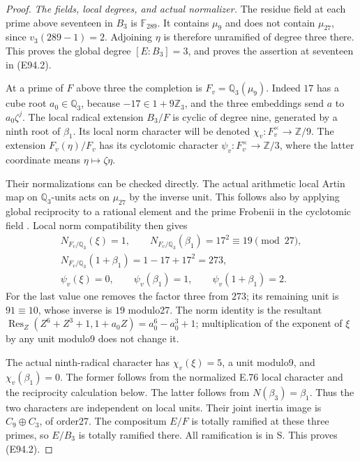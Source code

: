\begin{proof}
\emph{The fields, local degrees, and actual normalizer.}
The residue field at each prime above seventeen in
\(B_3\) is \(\mathbb F_{289}\). It contains \(\mu_9\)
and does not contain \(\mu_{27}\), since
\(v_3(289-1)=2\). Adjoining \(\eta\) is therefore
unramified of degree three there. This proves the
global degree \([E:B_3]=3\), and proves the assertion
at seventeen in (E94.2).

At a prime of \(F\) above three the completion is
\(F_v=\mathbb Q_3(\mu_9)\). Indeed \(17\) has a
cube root \(a_0\in\mathbb Q_3\), because
\(-17\in1+9\mathbb Z_3\), and the three embeddings
send \(a\) to \(a_0\zeta^j\). The local radical
extension \(B_3/F\) is cyclic of degree nine,
generated by a ninth root of \(\beta_1\).
Its local norm character will be denoted
\(\chi_v:F_v^\times\to\mathbb Z/9\).
The extension \(F_v(\eta)/F_v\) has its cyclotomic
character \(\psi_v:F_v^\times\to\mathbb Z/3\),
where the latter coordinate means
\(\eta\mapsto\zeta\eta\).

Their normalizations can be checked directly.
The actual arithmetic local Artin map on
\(\mathbb Q_3\)-units acts on \(\mu_{27}\) by
the inverse unit. This follows also by applying
global reciprocity to a rational element and
the prime Frobenii in the cyclotomic field
\cite[V,Example3.2,Proposition5.2,Theorem5.3 and
Summary5.10; III,Theorem3.4]{E_MilneCFT}.
Local norm compatibility then gives
\[
 \begin{gathered}
 N_{F_v/\mathbb Q_3}(\xi)=1,\qquad
 N_{F_v/\mathbb Q_3}(\beta_1)=17^2\equiv19\pmod{27},\\
 N_{F_v/\mathbb Q_3}(1+\beta_1)
       =1-17+17^2=273,\\
 \psi_v(\xi)=0,\qquad
 \psi_v(\beta_1)=1,\qquad
 \psi_v(1+\beta_1)=2.
 \end{gathered}
 \tag{E94.11}
\]
For the last value one removes the factor three
from \(273\); its remaining unit is \(91\equiv10\),
whose inverse is \(19\) modulo27. The norm identity
is the resultant
\(\operatorname{Res}_Z(Z^6+Z^3+1,1+a_0Z)
 =a_0^6-a_0^3+1\); multiplication of the exponent
of \(\xi\) by any unit modulo9 does not change it.

The actual ninth-radical character has
\(\chi_v(\xi)=5\), a unit modulo9, and
\(\chi_v(\beta_1)=0\). The former follows from
the normalized E.76 local character and the
reciprocity calculation below. The latter follows
from \(N(\beta_3)=\beta_1\). Thus the two characters
are independent on local units. Their joint inertia
image is \(C_9\oplus C_3\), of order27. The
compositum \(E/F\) is totally ramified at these
three primes, so \(E/B_3\) is totally ramified there.
All ramification is in S. This proves (E94.2).


\end{proof}
